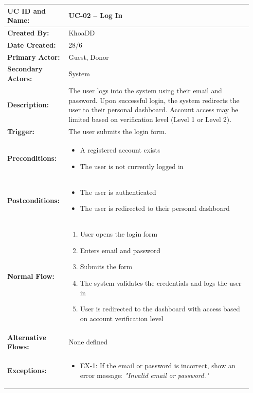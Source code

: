\documentclass[12pt,a4paper]{article}
\begin{document}
\renewcommand{\arraystretch}{1.5}
\begin{longtable}{|p{4.5cm}|p{10.5cm}|}
\hline
\textbf{UC ID and Name:} & UC-02 – Log In \\
\hline
\textbf{Created By:} & KhoaDD \\
\hline
\textbf{Date Created:} & 28/6 \\
\hline
\textbf{Primary Actor:} & Guest, Donor \\
\hline
\textbf{Secondary Actors:} & System \\
\hline
\textbf{Description:} & The user logs into the system using their email and password. Upon successful login, the system redirects the user to their personal dashboard. Account access may be limited based on verification level (Level 1 or Level 2). \\
\hline
\textbf{Trigger:} & The user submits the login form. \\
\hline
\textbf{Preconditions:} &
\begin{itemize}
  \item A registered account exists
  \item The user is not currently logged in
\end{itemize} \\
\hline
\textbf{Postconditions:} &
\begin{itemize}
  \item The user is authenticated
  \item The user is redirected to their personal dashboard
\end{itemize} \\
\hline
\textbf{Normal Flow:} &
\begin{enumerate}
  \item User opens the login form
  \item Enters email and password
  \item Submits the form
  \item The system validates the credentials and logs the user in
  \item User is redirected to the dashboard with access based on account verification level
\end{enumerate} \\
\hline
\textbf{Alternative Flows:} & None defined \\
\hline
\textbf{Exceptions:} &
\begin{itemize}
  \item EX-1: If the email or password is incorrect, show an error message: \textit{"Invalid email or password."}

\end{itemize}
\end{longtable}
\end{document}
